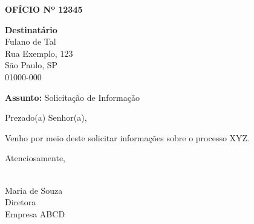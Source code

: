 \documentclass[a4paper,12pt]{article}
\begin{document}
\begin{center}
    \textbf{OFÍCIO Nº 12345}
\end{center}

\vspace{1cm}

\begin{flushright}
    \textbf{Destinatário} \\
    Fulano de Tal \\
    Rua Exemplo, 123 \\
    São Paulo, SP \\
    01000-000
\end{flushright}

\vspace{1cm}

\textbf{Assunto:} Solicitação de Informação

\vspace{1cm}

Prezado(a) Senhor(a),

\bigskip

Venho por meio deste solicitar informações sobre o processo XYZ.

\bigskip

Atenciosamente,

\vspace{1cm}

\hrulefill \\
Maria de Souza \\
Diretora \\
Empresa ABCD \\
\end{document}
